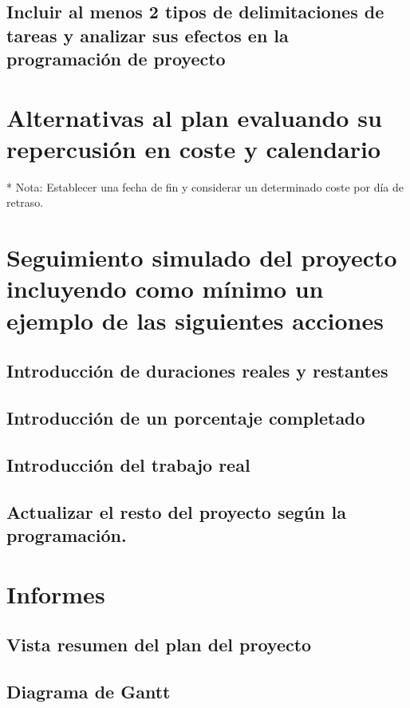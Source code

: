 \documentclass[11pt,a4paper,spanish,twoside]{book}
\begin{document}
\section{Incluir al menos 2 tipos de delimitaciones de tareas y 
  analizar sus efectos en la programación de proyecto}

\chapter{Alternativas al plan evaluando su repercusión en 
coste y  calendario}
* Nota: Establecer una fecha de fin y considerar un determinado coste por día
de retraso.

\chapter{Seguimiento simulado del proyecto incluyendo como 
  mínimo un ejemplo de las siguientes acciones}
\section{Introducción de duraciones reales y restantes}

\section{Introducción de un porcentaje completado}

\section{Introducción del trabajo real}

\section{Actualizar el resto del proyecto según la programación.}

\chapter{Informes}
\section{Vista resumen del plan del proyecto}

\section{Diagrama de Gantt}
\end{document}
